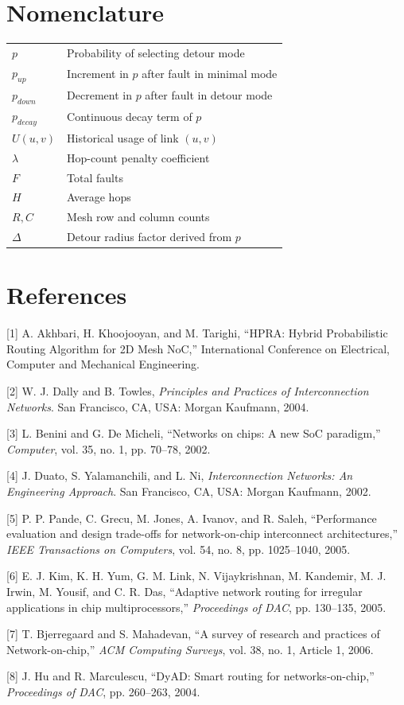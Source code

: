 \documentclass[10pt,a4paper]{article}
\begin{document}
\section*{Nomenclature}
\begin{tabular}{>{\raggedright\arraybackslash}p{2.8cm}p{11cm}}
$p$ & Probability of selecting detour mode \\
$p_{up}$ & Increment in $p$ after fault in minimal mode \\
$p_{down}$ & Decrement in $p$ after fault in detour mode \\
$p_{decay}$ & Continuous decay term of $p$ \\
$U(u,v)$ & Historical usage of link $(u,v)$ \\
$\lambda$ & Hop-count penalty coefficient \\
$F$ & Total faults \\
$H$ & Average hops \\
$R, C$ & Mesh row and column counts \\
$\Delta$ & Detour radius factor derived from $p$ \\
\end{tabular}

\section*{References}
[1] A. Akhbari, H. Khoojooyan, and M. Tarighi, ``HPRA: Hybrid Probabilistic Routing Algorithm for 2D Mesh NoC,'' International Conference on Electrical, Computer and Mechanical Engineering.

[2] W. J. Dally and B. Towles, \emph{Principles and Practices of Interconnection Networks}. San Francisco, CA, USA: Morgan Kaufmann, 2004.

[3] L. Benini and G. De Micheli, ``Networks on chips: A new SoC paradigm,'' \emph{Computer}, vol. 35, no. 1, pp. 70--78, 2002.

[4] J. Duato, S. Yalamanchili, and L. Ni, \emph{Interconnection Networks: An Engineering Approach}. San Francisco, CA, USA: Morgan Kaufmann, 2002.

[5] P. P. Pande, C. Grecu, M. Jones, A. Ivanov, and R. Saleh, ``Performance evaluation and design trade-offs for network-on-chip interconnect architectures,'' \emph{IEEE Transactions on Computers}, vol. 54, no. 8, pp. 1025--1040, 2005.

[6] E. J. Kim, K. H. Yum, G. M. Link, N. Vijaykrishnan, M. Kandemir, M. J. Irwin, M. Yousif, and C. R. Das, ``Adaptive network routing for irregular applications in chip multiprocessors,'' \emph{Proceedings of DAC}, pp. 130--135, 2005.

[7] T. Bjerregaard and S. Mahadevan, ``A survey of research and practices of Network-on-chip,'' \emph{ACM Computing Surveys}, vol. 38, no. 1, Article 1, 2006.

[8] J. Hu and R. Marculescu, ``DyAD: Smart routing for networks-on-chip,'' \emph{Proceedings of DAC}, pp. 260--263, 2004.
\end{document}
